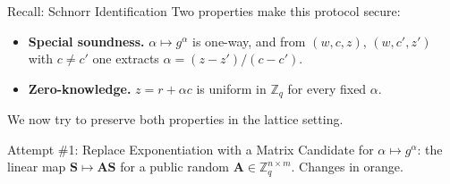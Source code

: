 \documentclass{zkdl-presentation-template}
\begin{document}
\begin{frame}{Recall: Schnorr Identification}
        \vspace{5pt}
        Two properties make this protocol secure:
        \begin{itemize}
            \item \textbf{Special soundness.} $\alpha \mapsto g^{\alpha}$ is one-way, and from $(w,c,z)$, $(w,c',z')$ with $c \neq c'$ one extracts $\alpha = (z-z')/(c-c')$.\pause
            \item \textbf{Zero-knowledge.} $z = r + \alpha c$ is uniform in $\mathbb{Z}_q$ for every fixed $\alpha$.
        \end{itemize}
        \pause
        We now try to preserve both properties in the lattice setting.
    \end{frame}

    \begin{frame}{Attempt \#1: Replace Exponentiation with a Matrix}
        Candidate for $\alpha \mapsto g^{\alpha}$: the linear map $\mathbf{S} \mapsto \mathbf{A}\mathbf{S}$ for a public random $\mathbf{A} \in \mathbb{Z}_q^{n \times m}$. Changes in \colorbox{oc-orange-1}{orange}.


\end{frame}
\end{document}
